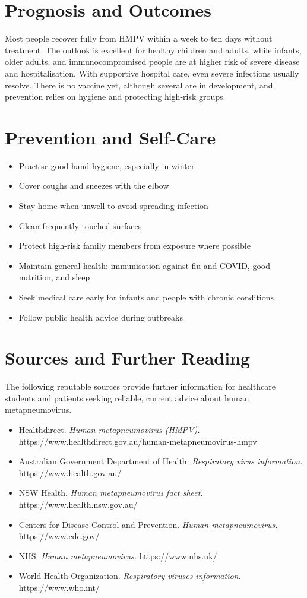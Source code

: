 \section*{Prognosis and Outcomes}
Most people recover fully from HMPV within a week to ten days without treatment. The outlook is excellent for healthy children and adults, while infants, older adults, and immunocompromised people are at higher risk of severe disease and hospitalisation. With supportive hospital care, even severe infections usually resolve. There is no vaccine yet, although several are in development, and prevention relies on hygiene and protecting high-risk groups.

\section*{Prevention and Self-Care}
\begin{itemize}
    \item Practise good hand hygiene, especially in winter
    \item Cover coughs and sneezes with the elbow
    \item Stay home when unwell to avoid spreading infection
    \item Clean frequently touched surfaces
    \item Protect high-risk family members from exposure where possible
    \item Maintain general health: immunisation against flu and COVID, good nutrition, and sleep
    \item Seek medical care early for infants and people with chronic conditions
    \item Follow public health advice during outbreaks
\end{itemize}

\section*{Sources and Further Reading}
The following reputable sources provide further information for healthcare students and patients seeking reliable, current advice about human metapneumovirus.

\begin{itemize}
    \item Healthdirect. \textit{Human metapneumovirus (HMPV).} https://www.healthdirect.gov.au/human-metapneumovirus-hmpv
    \item Australian Government Department of Health. \textit{Respiratory virus information.} https://www.health.gov.au/
    \item NSW Health. \textit{Human metapneumovirus fact sheet.} https://www.health.nsw.gov.au/
    \item Centers for Disease Control and Prevention. \textit{Human metapneumovirus.} https://www.cdc.gov/
    \item NHS. \textit{Human metapneumovirus.} https://www.nhs.uk/
    \item World Health Organization. \textit{Respiratory viruses information.} https://www.who.int/
\end{itemize}
